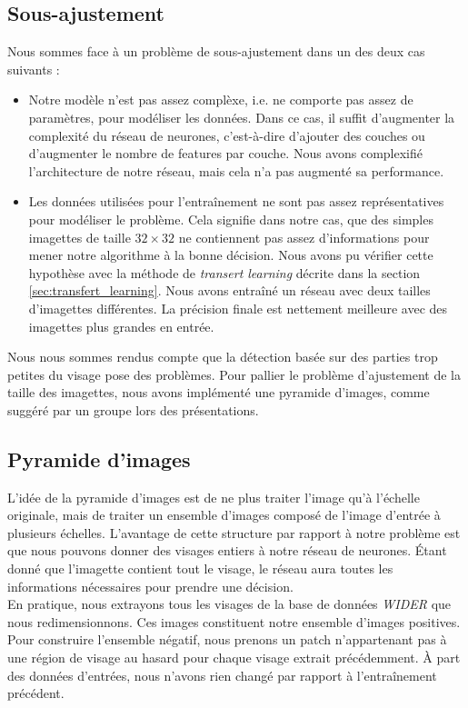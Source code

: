 \documentclass[a4paper,11pt]{article}
\begin{document}
\subsection{Sous-ajustement}
\label{sec:sous-ajustement}

    Nous sommes face à un problème de sous-ajustement dans un des deux cas suivants :
    \begin{itemize}
        \item 
            Notre modèle n'est pas assez complèxe, i.e. ne comporte pas assez de paramètres, pour modéliser les données.
            Dans ce cas, il suffit d'augmenter la complexité du réseau de neurones, c'est-à-dire d'ajouter des couches ou d'augmenter le nombre de features par couche.
            Nous avons complexifié l'architecture de notre réseau, mais cela n'a pas augmenté sa performance.

        \item
            Les données utilisées pour l'entraînement ne sont pas assez représentatives pour modéliser le problème.
            Cela signifie dans notre cas, que des simples imagettes de taille $32\times32$ ne contiennent pas assez d'informations pour mener notre algorithme à la bonne décision.
            Nous avons pu vérifier cette hypothèse avec la méthode de \textit{transert learning} décrite dans la section \ref{sec:transfert_learning}.
            Nous avons entraîné un réseau avec deux tailles d'imagettes différentes.
            La précision finale est nettement meilleure avec des imagettes plus grandes en entrée. 
    \end{itemize}

    Nous nous sommes rendus compte que la détection basée sur des parties trop petites du visage pose des problèmes.
    Pour pallier le problème d'ajustement de la taille des imagettes, nous avons implémenté une
    pyramide d'images, comme suggéré par un groupe lors des présentations.

\subsection{Pyramide d'images}

    L'idée de la pyramide d'images est de ne plus traiter l'image qu'à l'échelle originale, mais de traiter un ensemble d'images composé de l'image d'entrée à plusieurs échelles.
    L'avantage de cette structure par rapport à notre problème est que nous pouvons donner des visages entiers à notre réseau de neurones.
    Étant donné que l'imagette contient tout le visage, le réseau aura toutes les informations nécessaires pour prendre une décision.
    \\
    En pratique, nous extrayons tous les visages de la base de données \textit{WIDER} que nous redimensionnons.
    Ces images constituent notre ensemble d'images positives.
    Pour construire l'ensemble négatif, nous prenons un patch n'appartenant pas à une région de visage au hasard pour chaque visage extrait précédemment.
    À part des données d'entrées, nous n'avons rien changé par rapport à l'entraînement précédent.
\end{document}
